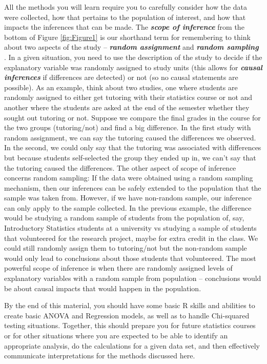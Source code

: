 \documentclass[]{book}
\begin{document}
All the methods you will learn require you to carefully consider how the
data were collected, how that pertains to the population of interest,
and how that impacts the inferences that can be made. The
\textbf{\emph{scope of inference}} from the bottom of Figure
\ref{fig:Figure1} is our shorthand term for remembering to think about
two aspects of the study -- \textbf{\emph{random assignment}} and
\textbf{\emph{random sampling}} . In a given situation, you need to use
the description of the study to decide if the explanatory variable was
randomly assigned to study units (this allows for \textbf{\emph{causal
inferences}} if differences are detected) or not (so no causal
statements are possible). As an example, think about two studies, one
where students are randomly assigned to either get tutoring with their
statistics course or not and another where the students are asked at the
end of the semester whether they sought out tutoring or not. Suppose we
compare the final grades in the course for the two groups (tutoring/not)
and find a big difference. In the first study with random assignment, we
can say the tutoring caused the differences we observed. In the second,
we could only say that the tutoring was associated with differences but
because students self-selected the group they ended up in, we can't say
that the tutoring caused the differences. The other aspect of scope of
inference concerns random sampling: If the data were obtained using a
random sampling mechanism, then our inferences can be safely extended to
the population that the sample was taken from. However, if we have
non-random sample, our inference can only apply to the sample collected.
In the previous example, the difference would be studying a random
sample of students from the population of, say, Introductory Statistics
students at a university vs studying a sample of students that
volunteered for the research project, maybe for extra credit in the
class. We could still randomly assign them to tutoring/not but the
non-random sample would only lead to conclusions about those students
that volunteered. The most powerful scope of inference is when there are
randomly assigned levels of explanatory variables with a random sample
from population -- conclusions would be about causal impacts that would
happen in the population.

By the end of this material, you should have some basic R skills and
abilities to create basic ANOVA and Regression models, as well as to
handle Chi-squared testing situations. Together, this should prepare you
for future statistics courses or for other situations where you are
expected to be able to identify an appropriate analysis, do the
calculations for a given data set, and then effectively communicate
interpretations for the methods discussed here.
\end{document}
